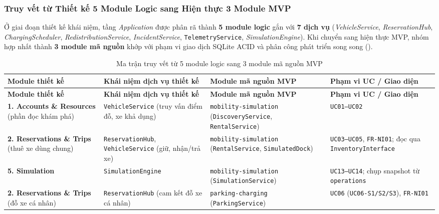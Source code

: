\subsubsection*{Truy vết từ Thiết kế 5 Module Logic sang Hiện thực 3 Module MVP}

Ở giai đoạn thiết kế khái niệm, tầng \textit{Application} được phân rã thành \textbf{5 module logic} gắn với \textbf{7 dịch vụ} (\textit{VehicleService}, \textit{ReservationHub}, \textit{ChargingScheduler}, \textit{RedistributionService}, \textit{IncidentService}, \texttt{TelemetryService}, \textit{SimulationEngine}). Khi chuyển sang hiện thực MVP, nhóm hợp nhất thành \textbf{3 module mã nguồn} khớp với phạm vi giao dịch SQLite ACID và phân công phát triển song song ().

\begin{longtable}{>{\raggedright\arraybackslash}p{3.4cm} >{\raggedright\arraybackslash}p{3.8cm} >{\raggedright\arraybackslash}p{4.3cm} >{\raggedright\arraybackslash}p{2.6cm}}
\caption{Ma trận truy vết từ 5 module logic sang 3 module mã nguồn MVP} \label{tab:module-traceability} \\
\toprule
\textbf{Module thiết kế} & \textbf{Khái niệm dịch vụ thiết kế} & \textbf{Module mã nguồn MVP} & \textbf{Phạm vi UC / Giao diện} \\
\midrule
\endfirsthead
\toprule
\textbf{Module thiết kế} & \textbf{Khái niệm dịch vụ thiết kế} & \textbf{Module mã nguồn MVP} & \textbf{Phạm vi UC / Giao diện} \\
\midrule
\endhead
\bottomrule
\endfoot
\textbf{1. Accounts \& Resources} (phần đọc khám phá) & \texttt{VehicleService} (truy vấn điểm đỗ, xe khả dụng) & \texttt{mobility-simulation} (\texttt{DiscoveryService}, \texttt{RentalService}) & \texttt{UC01--UC02} \\
\midrule
\textbf{2. Reservations \& Trips} (thuê xe dùng chung) & \texttt{ReservationHub}, \texttt{VehicleService} (giữ, nhận/trả xe) & \texttt{mobility-simulation} (\texttt{RentalService}, \texttt{SimulatedDock}) & \texttt{UC03--UC05}, \texttt{FR-NI01}; đọc qua \texttt{InventoryInterface} \\
\midrule
\textbf{5. Simulation} & \texttt{SimulationEngine} & \texttt{mobility-simulation} (\texttt{SimulationService}) & \texttt{UC13--UC14}; chụp snapshot từ \texttt{operations} \\
\midrule
\textbf{2. Reservations \& Trips} (đỗ xe cá nhân) & \texttt{ReservationHub} (cam kết đỗ xe cá nhân) & \texttt{parking-charging} (\texttt{ParkingService}) & \texttt{UC06} (\texttt{UC06-S1/S2/S3}), \texttt{FR-NI01} \\

\end{longtable}
